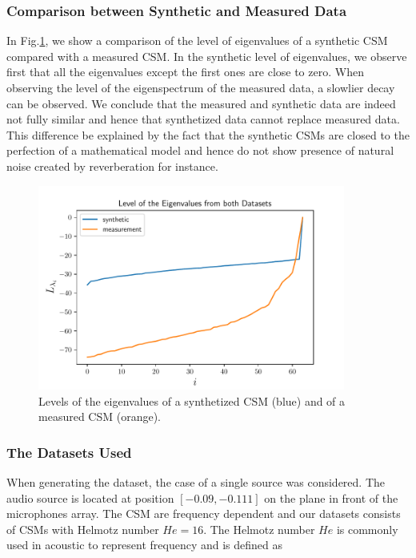 \documentclass[11pt,a4paper,twoside]{report}
\begin{document}
\subsubsection{Comparison between Synthetic and Measured Data}

In Fig.\ref{fig:comparison_synthetic_measurement_data}, we show a comparison of the level of eigenvalues of a synthetic CSM compared with a measured CSM. In the synthetic level of eigenvalues, we observe first that all the eigenvalues except the first ones are close to zero. When observing the level of the eigenspectrum of the measured data, a slowlier decay can be observed. We conclude that the measured and synthetic data are indeed not fully similar and hence that synthetized data cannot replace measured data. This difference be explained by the fact that the synthetic CSMs are closed to the perfection of a mathematical model and hence do not show presence of natural noise created by reverberation for instance.

\begin{figure}
    \centering
    \includegraphics[width=0.9\textwidth]{figs/comparison_synthetic_measurement_data.pdf}
    \caption{Levels of the eigenvalues of a synthetized CSM (blue) and of a measured CSM (orange).}
    \label{fig:comparison_synthetic_measurement_data}    
\end{figure}


\subsubsection{The Datasets Used}

When generating the dataset, the case of a single source was considered. The audio source is located at position $[-0.09,-0.111]$ on the plane in front of the microphones array. The CSM are frequency dependent and our datasets consists of CSMs with Helmotz number $He = 16$. The Helmotz number $He$ is commonly used in acoustic to represent frequency and is defined as
\end{document}

